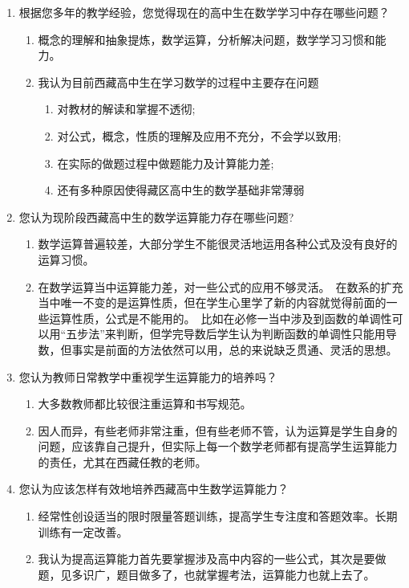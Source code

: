 \begin{enumerate}[\chinese*、]
  \item 根据您多年的教学经验，您觉得现在的高中生在数学学习中存在哪些问题？
    \begin{enumerate}[A:]
      \item 概念的理解和抽象提炼，数学运算，分析解决问题，数学学习习惯和能力。
      \item 我认为目前西藏高中生在学习数学的过程中主要存在问题
        \begin{enumerate}[1 ,leftmargin = 1em]
          \item 对教材的解读和掌握不透彻;
          \item 对公式，概念，性质的理解及应用不充分，不会学以致用;
          \item 在实际的做题过程中做题能力及计算能力差;
          \item 还有多种原因使得藏区高中生的数学基础非常薄弱
        \end{enumerate}
    \end{enumerate}
  \item 您认为现阶段西藏高中生的数学运算能力存在哪些问题?
    \begin{enumerate}[A:]
      \item 数学运算普遍较差，大部分学生不能很灵活地运用各种公式及没有良好的运算习惯。
      \item 在数学运算当中运算能力差，对一些公式的应用不够灵活。 在数系的扩充当中唯一不变的是运算性质，但在学生心里学了新的内容就觉得前面的一些运算性质，公式是不能用的。 比如在必修一当中涉及到函数的单调性可以用“五步法”来判断，但学完导数后学生认为判断函数的单调性只能用导数，但事实是前面的方法依然可以用，总的来说缺乏贯通、灵活的思想。
    \end{enumerate}
  \item 您认为教师日常教学中重视学生运算能力的培养吗？
    \begin{enumerate}[A:]
      \item 大多数教师都比较很注重运算和书写规范。
      \item 因人而异，有些老师非常注重，但有些老师不管，认为运算是学生自身的问题，应该靠自己提升，但实际上每一个数学老师都有提高学生运算能力的责任，尤其在西藏任教的老师。
    \end{enumerate}
  \item 您认为应该怎样有效地培养西藏高中生数学运算能力？
    \begin{enumerate}[A:]
      \item 经常性创设适当的限时限量答题训练，提高学生专注度和答题效率。长期训练有一定改善。
      \item 我认为提高运算能力首先要掌握涉及高中内容的一些公式，其次是要做题，见多识广，题目做多了，也就掌握考法，运算能力也就上去了。
    \end{enumerate}
\end{enumerate}

